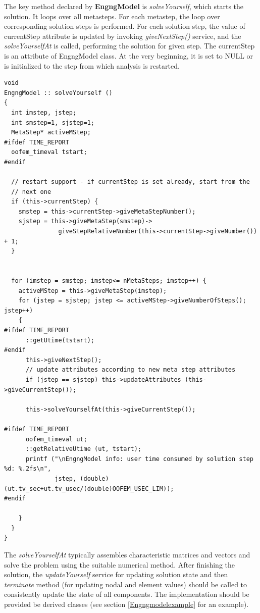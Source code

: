 \documentclass[a4paper]{article}
\newcommand{\class}[1]{{\bf #1}}
\newcommand{\service}[1]{{\em #1}}
\begin{document}
The key method declared by \class{EngngModel} is
\service{solveYourself}, which starts the solution. It loops over all
metasteps. For each metastep, the loop over corresponding solution steps is
performed. For each solution step, the value of currentStep attribute
is updated  by invoking \service{giveNextStep()} service, and
the \service{solveYourselfAt} is 
called, performing the solution for given step. The currentStep is
an attribute of EngngModel class. At the very beginning, it is set to
NULL or is initialized to the step from which analysis is restarted.

{\small\begin{verbatim}
void 
EngngModel :: solveYourself ()
{
  int imstep, jstep;
  int smstep=1, sjstep=1;
  MetaStep* activeMStep;
#ifdef TIME_REPORT
  oofem_timeval tstart;
#endif

  // restart support - if currentStep is set already, start from the
  // next one
  if (this->currentStep) {
    smstep = this->currentStep->giveMetaStepNumber();
    sjstep = this->giveMetaStep(smstep)->
               giveStepRelativeNumber(this->currentStep->giveNumber()) + 1;
  }


  for (imstep = smstep; imstep<= nMetaSteps; imstep++) {
    activeMStep = this->giveMetaStep(imstep);
    for (jstep = sjstep; jstep <= activeMStep->giveNumberOfSteps(); jstep++)
    {
#ifdef TIME_REPORT
      ::getUtime(tstart);
#endif
      this->giveNextStep();
      // update attributes according to new meta step attributes
      if (jstep == sjstep) this->updateAttributes (this->giveCurrentStep());
      
      this->solveYourselfAt(this->giveCurrentStep());

#ifdef TIME_REPORT
      oofem_timeval ut;
      ::getRelativeUtime (ut, tstart);
      printf ("\nEngngModel info: user time consumed by solution step %d: %.2fs\n", 
              jstep, (double)(ut.tv_sec+ut.tv_usec/(double)OOFEM_USEC_LIM));
#endif

    }
  }
}
\end{verbatim}}

The \service{solveYourselfAt} typically assembles characteristic matrices and vectors 
and solve the problem using the suitable numerical method. After
finishing the solution,
the \service{updateYourself} service for updating solution state and
then \service{terminate} method (for updating nodal and element
values) should be called to consistently update the state of all
components. The implementation should be provided be derived classes
(see section \ref{Engngmodelexample} for an example).
\end{document}
